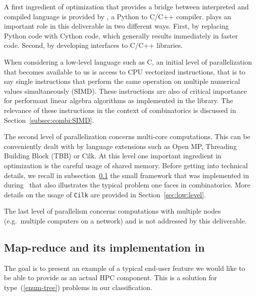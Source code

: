 \documentclass{deliverablereport}
\newcommand{\Cilk}{\texttt{Cilk}\xspace}
\begin{document}
A first ingredient of optimization that provides a bridge between interpreted
and compiled language is provided by \Cython, a Python
to C/C++ compiler. \Cython plays an important role in this deliverable in two
different ways. First, by replacing Python code with Cython code, which generally results
immediately in faster code. Second, by developing interfaces to C/C++ libraries.

When considering a low-level language such as C, an initial level of
parallelization that becomes available to us is access to CPU vectorized
instructions, that is to say single instructions that perform the same operation on multiple
numerical values simultaneously (SIMD). These instructions are also of critical importance for performant
linear algebra algorithms as implemented in the \Linbox library. The relevance of these instructions in the
context of combinatorics is discussed in Section~\ref{subsec:combi:SIMD}.

The second level of parallelization concerns multi-core computations. This can
be conveniently dealt with by language extensions such as Open MP, Threading
Building Block (TBB) or Cilk. At this level one important ingredient in
optimization is the careful usage of shared memory.  Before getting into
technical details, we recall in subsection~\ref{subsec:map-reduce:Sage} the
small framework that was implemented in \Sage
during~ that also illustrates the typical
problem one faces in combinatorics.  More details on the usage of \Cilk are
provided in Section~\ref{sec:low:level}.

The last level of parallelism concerns computations with multiple nodes
(e.g.~multiple computers on a network) and is not addressed by this
deliverable.

\subsection{Map-reduce and its implementation in \Sage}
\label{subsec:map-reduce:Sage}

The goal is to present an example of a typical end-user feature we would like
to be able to provide as an actual HPC component. This is a solution for
type~(\ref{enum-tree}) problems in our classification.
\end{document}
